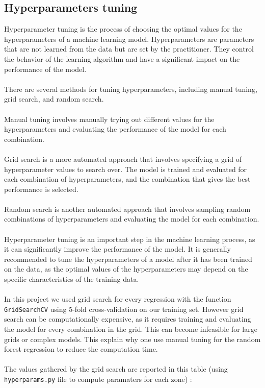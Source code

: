 \subsection*{Hyperparameters tuning}
Hyperparameter tuning is the process of choosing the optimal values for the hyperparameters of a machine learning model. Hyperparameters are parameters that are not learned from the data but are set by the practitioner. They control the behavior of the learning algorithm and have a significant impact on the performance of the model. 
\\\\
There are several methods for tuning hyperparameters, including manual tuning, grid search, and random search. 
\\\\
Manual tuning involves manually trying out different values for the hyperparameters and evaluating the performance of the model for each combination.
\\\\
Grid search is a more automated approach that involves specifying a grid of hyperparameter values to search over. The model is trained and evaluated for each combination of hyperparameters, and the combination that gives the best performance is selected.
\\\\
Random search is another automated approach that involves sampling random combinations of hyperparameters and evaluating the model for each combination. 
\\\\
Hyperparameter tuning is an important step in the machine learning process, as it can significantly improve the performance of the model. It is generally recommended to tune the hyperparameters of a model after it has been trained on the data, as the optimal values of the hyperparameters may depend on the specific characteristics of the training data.
\\\\
In this project we used grid search for every regression with the function \verb|GridSearchCV| using 5-fold cross-validation on our training set. However grid search can be computationally expensive, as it requires training and evaluating the model for every combination in the grid. This can become infeasible for large grids or complex models. This explain why one use manual tuning for the random forest regression to reduce the computation time.
\\\\
The values gathered by the grid search are reported in this table (using \verb|hyperparams.py| file to compute paramaters for each zone) :

